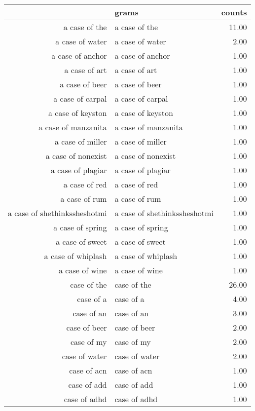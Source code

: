 \begin{table}[ht]
\centering
\begin{tabular}{rlr}
  \hline
 & grams & counts \\ 
  \hline
a case of the & a case of the & 11.00 \\ 
  a case of water & a case of water & 2.00 \\ 
  a case of anchor & a case of anchor & 1.00 \\ 
  a case of art & a case of art & 1.00 \\ 
  a case of beer & a case of beer & 1.00 \\ 
  a case of carpal & a case of carpal & 1.00 \\ 
  a case of keyston & a case of keyston & 1.00 \\ 
  a case of manzanita & a case of manzanita & 1.00 \\ 
  a case of miller & a case of miller & 1.00 \\ 
  a case of nonexist & a case of nonexist & 1.00 \\ 
  a case of plagiar & a case of plagiar & 1.00 \\ 
  a case of red & a case of red & 1.00 \\ 
  a case of rum & a case of rum & 1.00 \\ 
  a case of shethinkssheshotmi & a case of shethinkssheshotmi & 1.00 \\ 
  a case of spring & a case of spring & 1.00 \\ 
  a case of sweet & a case of sweet & 1.00 \\ 
  a case of whiplash & a case of whiplash & 1.00 \\ 
  a case of wine & a case of wine & 1.00 \\ 
  case of the & case of the & 26.00 \\ 
  case of a & case of a & 4.00 \\ 
  case of an & case of an & 3.00 \\ 
  case of beer & case of beer & 2.00 \\ 
  case of my & case of my & 2.00 \\ 
  case of water & case of water & 2.00 \\ 
  case of acn & case of acn & 1.00 \\ 
  case of add & case of add & 1.00 \\ 
  case of adhd & case of adhd & 1.00 \\ 

\end{tabular}
\end{table}
